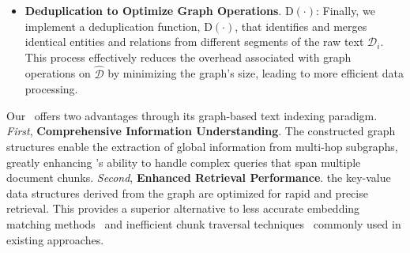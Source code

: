 \begin{itemize}[leftmargin=*]

    \item \textbf{Deduplication to Optimize Graph Operations}. $\text{D}(\cdot)$: Finally, we implement a deduplication function, $\text{D}(\cdot)$, that identifies and merges identical entities and relations from different segments of the raw text $\mathcal{D}_i$. This process effectively reduces the overhead associated with graph operations on $\hat{\mathcal{D}}$ by minimizing the graph's size, leading to more efficient data processing.
    
\end{itemize}

Our \model\ offers two advantages through its graph-based text indexing paradigm. \emph{First}, \textbf{Comprehensive Information Understanding}. The constructed graph structures enable the extraction of global information from multi-hop subgraphs, greatly enhancing \model's ability to handle complex queries that span multiple document chunks. \emph{Second}, \textbf{Enhanced Retrieval Performance}. the key-value data structures derived from the graph are optimized for rapid and precise retrieval. This provides a superior alternative to less accurate embedding matching methods~\citep{gao2023retrieval} and inefficient chunk traversal techniques~\citep{edge2024local} commonly used in existing approaches.




